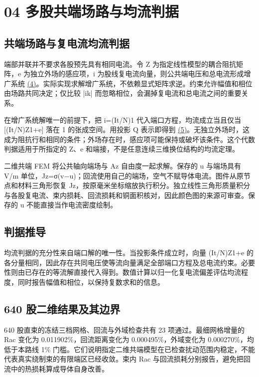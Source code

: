 \documentclass[11pt]{article}
\begin{document}
\section*{04 多股共端场路与均流判据}
\hypertarget{chapter-04}{}
\subsection*{共端场路与复电流均流判据}
\hypertarget{04.common.heading}{}
端部并联并不要求各股预先具有相同电流。令 Z 为指定线性模型的耦合阻抗矩阵，e 为独立外场的感应项，i 为股线复电流向量，则公共端电压和总电流形成增广系统 \href{report_zh-CN_single.pdf#E04}{(4)}。实际实现求解增广系统，不依赖显式矩阵求逆。约束允许幅值和相位由场路共同决定；仅比较 |ik| 而忽略相位，会漏掉复电流和总电流之间的重要关系。


在增广系统解唯一的前提下，把 i=(It/N)1 代入端口方程，均流成立当且仅当 [(It/N)Z1+e] 落在 1 的张成空间。用投影 Q 表示即得到 \href{report_zh-CN_single.pdf#E05}{(5)}。无独立外场时，这成为阻抗行和相同的条件；外场存在时，感应项可能保持或破坏该条件。这个代数判据适用于所指定的 Z、e 和端接，不是任意连续三维换位结构的均流定理。


二维共端 FEM 将公共轴向端场与 Az 自由度一起求解。保存的 u 与端场具有 V/m 单位，Jz=σ(v−u)；回流使用自己的端场，空气不赋导体电流。图件从原节点和材料三角形恢复 Jz，按原毫米坐标缩放执行积分。独立线性三角形质量积分与各股复电流、束内损耗、回流损耗和铜面积核对，因此颜色图的来源可审查。保存的 u 不能直接当作电流密度绘制。


\subsection*{判据推导}
\hypertarget{04.sharing_derivation.heading}{}
均流判据的充分性来自端口解的唯一性。当投影条件成立时，向量 (It/N)Z1+e 的各分量相同，因此存在共同电压使等流向量满足全部端口方程及总电流约束。必要性则由已存在的等流解直接代入得到。数值计算以归一化复电流偏差评估均流程度，同时报告幅值和相位，以保持复数求和的信息。


\subsection*{640 股二维结果及其边界}
\hypertarget{04.coax_results.heading}{}
640 股直束的冻结三档网格、回流与外域检查共有 23 项通过。最细网格增量的 Rac 变化为 0.011902\%，回流距离变化为 0.000495\%，外域变化为 0.000270\%，均低于本路线 1\% 门槛。它们说明指定二维共端模型在已检查扰动范围内稳定，不能代表真实绕制束的有限端区已经收敛。束内 Rac 与回流损耗分别报告，避免把回流中的热损耗算成导体自身改善。
\end{document}

